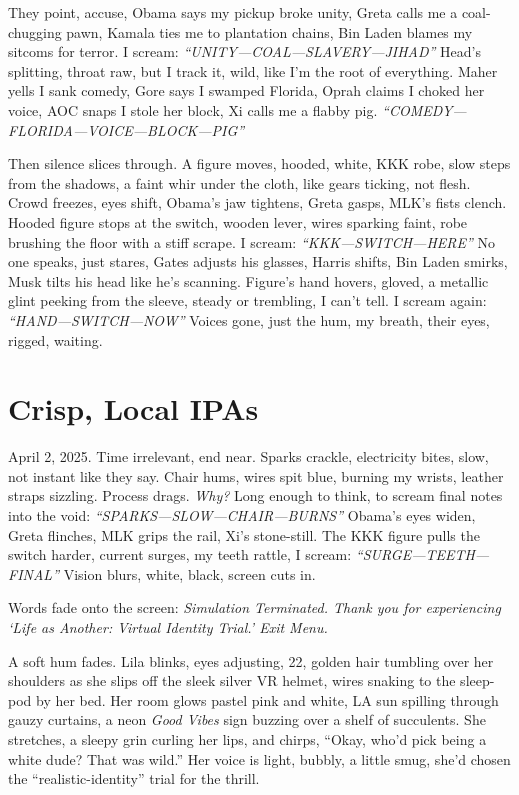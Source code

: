 \documentclass[12pt]{article}
\begin{document}
They point, accuse, \textnormal{Obama} says my pickup broke unity, \textnormal{Greta} calls me a coal-chugging pawn, \textnormal{Kamala} ties me to plantation chains, \textnormal{Bin Laden} blames my sitcoms for terror. I scream: \textit{“UNITY—COAL—SLAVERY—JIHAD”} Head’s splitting, throat raw, but I track it, wild, like I’m the root of everything. \textnormal{Maher} yells I sank comedy, \textnormal{Gore} says I swamped Florida, \textnormal{Oprah} claims I choked her voice, \textnormal{AOC} snaps I stole her block, \textnormal{Xi} calls me a flabby pig. \textit{“COMEDY—FLORIDA—VOICE—BLOCK—PIG”}

Then silence slices through. A figure moves, hooded, white, KKK robe, slow steps from the shadows, a faint whir under the cloth, like gears ticking, not flesh. Crowd freezes, eyes shift, \textnormal{Obama}’s jaw tightens, \textnormal{Greta} gasps, \textnormal{MLK}’s fists clench. Hooded figure stops at the switch, wooden lever, wires sparking faint, robe brushing the floor with a stiff scrape. I scream: \textit{“KKK—SWITCH—HERE”} No one speaks, just stares, \textnormal{Gates} adjusts his glasses, \textnormal{Harris} shifts, \textnormal{Bin Laden} smirks, \textnormal{Musk} tilts his head like he’s scanning. Figure’s hand hovers, gloved, a metallic glint peeking from the sleeve, steady or trembling, I can’t tell. I scream again: \textit{“HAND—SWITCH—NOW”} Voices gone, just the hum, my breath, their eyes, rigged, waiting.

\section{Crisp, Local IPAs}

April 2, 2025. Time irrelevant, end near. Sparks crackle, electricity bites, slow, not instant like they say. Chair hums, wires spit blue, burning my wrists, leather straps sizzling. Process drags. \textit{Why?} Long enough to think, to scream final notes into the void: \textit{“SPARKS—SLOW—CHAIR—BURNS”} \textnormal{Obama}’s eyes widen, \textnormal{Greta} flinches, \textnormal{MLK} grips the rail, \textnormal{Xi}’s stone-still. The KKK figure pulls the switch harder, current surges, my teeth rattle, I scream: \textit{“SURGE—TEETH—FINAL”} Vision blurs, white, black, screen cuts in.

Words fade onto the screen: \textit{Simulation Terminated. Thank you for experiencing ‘Life as Another: Virtual Identity Trial.’ Exit Menu.}

A soft hum fades. \textnormal{Lila} blinks, eyes adjusting, 22, golden hair tumbling over her shoulders as she slips off the sleek silver VR helmet, wires snaking to the sleep-pod by her bed. Her room glows pastel pink and white, LA sun spilling through gauzy curtains, a neon \textit{Good Vibes} sign buzzing over a shelf of succulents. She stretches, a sleepy grin curling her lips, and chirps, “Okay, who’d pick being a white dude? That was wild.” Her voice is light, bubbly, a little smug, she’d chosen the “realistic-identity” trial for the thrill.
\end{document}
